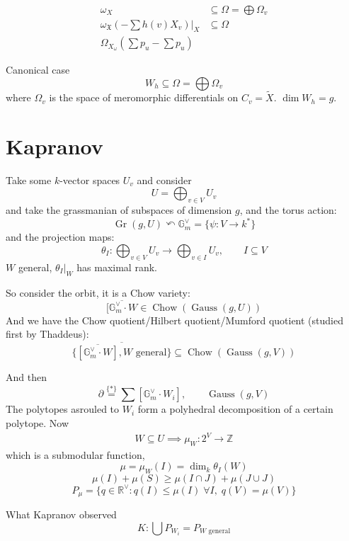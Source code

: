 \begin{align*}
	\omega_X&\subseteq \Omega =\bigoplus\Omega_v\\
	\omega_{\mathfrak{X}}\left( -\sum h(v)X_{v} \right) \Big|_{X}&\subseteq \Omega \\
	\Omega_{X_{ \omega}}\left( \sum p_u-\sum p_u \right) 
\end{align*}

\begin{idea6}{Canonical case}\leavevmode
	\[W_h\subseteq \Omega =\bigoplus\Omega_v  \]
	where $\Omega_v$ is the space of meromorphic differentials on $C_v=\tilde{X}$. $\dim W_h=g$.
\end{idea6}

\section{Kapranov}
Take some $k$-vector spaces $U_v$ and consider
 \[U=\bigoplus_{v\in V} U_v \]
 and take the grassmanian of subspaces of dimension $g$, and the torus action:
 \[\operatorname{Gr}(g,U)\curvearrowleft  \mathbb{G}^\vee_m=\{\psi:V\to k^*\} \]
 and the projection maps:
 \[\theta_I:\bigoplus_{v\in V} U_v\longrightarrow \bigoplus_{v\in I} U_v,\qquad I\subseteq V  \]
$W$ general, $\theta_I\Big|_{W}$ has maximal rank.

So consider the orbit, it is a Chow variety:
\[\overline{[\mathbb{G}^\vee_m\cdot W}\in\operatorname{Chow}(\operatorname{Gauss}(g,U))\]
And we have the Chow quotient/Hilbert quotient/Mumford quotient (studied first by Thaddeus):
\[\overline{\{\overline{[\mathbb{G}^\vee_m\cdot W]},W\text{ general} \}} \subseteq \operatorname{Chow}(\operatorname{Gauss}(g,V))\]

And then
\[\partial\overset{\{*\}} =\sum [\mathbb{G}^\vee_m\cdot W_i],\qquad \operatorname{Gauss}(g,V)\]
The polytopes asrouled to $W_i$ form a polyhedral decomposition of a certain polytope. Now
\begin{align*}
	W\subseteq U\implies  \mu_W:2^V\longrightarrow \mathbb{Z}
\end{align*}
which is a submodular function,
\[\mu=\mu_W(I)=\dim _k\theta_I(W)\]
\[\mu(I)+\mu(S)\geq \mu(I\cap J)+\mu(J\cup J)\]
\[P_\mu=\{q\in\mathbb{R}^{\vee }:q(I)\leq \mu(I)\;\forall I,\; q(V)=\mu(V)\}\]

\begin{idea5}{What Kapranov observed}\leavevmode
	\[K:\bigcup P_{W_i}=P_{W\text{ general} } \]
\end{idea5}




